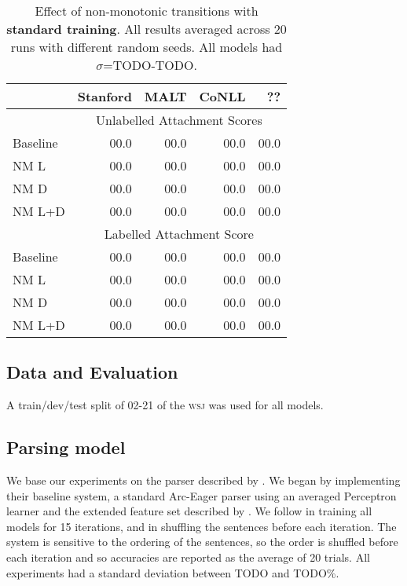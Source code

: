 \documentclass[11pt,letterpaper]{article}
\newcommand{\wsj}{\textsc{wsj}\xspace}
\begin{document}
\begin{table}[t]
    \small
    \centering
    \begin{tabular}{l|rrrr}
        \hline
                              & Stanford & MALT & CoNLL & ?? \\
        \hline \hline
                              & \multicolumn{4}{c}{Unlabelled Attachment Scores} \\
        \hline
        Baseline              &  00.0  & 00.0 & 00.0 & 00.0   \\
        NM L                  &  00.0  & 00.0 & 00.0 & 00.0   \\
        NM D                  &  00.0  & 00.0 & 00.0 & 00.0   \\
        NM L+D                &  00.0  & 00.0 & 00.0 & 00.0    \\ 
        \hline
                              & \multicolumn{4}{c}{Labelled Attachment Score} \\
        \hline
        Baseline              &  00.0  & 00.0 & 00.0  & 00.0   \\
        NM L                  &  00.0  & 00.0 & 00.0  & 00.0   \\
        NM D                  &  00.0  & 00.0 & 00.0  & 00.0   \\
        NM L+D                &  00.0  & 00.0 & 00.0  & 00.0   \\ 
        \hline
    \end{tabular}
    \caption{\small Effect of non-monotonic transitions with \textbf{standard training}.
             All results averaged across 20 runs with different random seeds. All models
             had $\sigma$=TODO-TODO.\label{tab:standard}}
\end{table}


\subsection{Data and Evaluation}



A train/dev/test split of 02-21 of the \wsj was used for all models.


\subsection{Parsing model}

We base our experiments on the parser described by \citet{goldberg:12}. We
began by implementing their baseline system, a standard Arc-Eager parser using
an averaged Perceptron learner and the extended feature set described by \citet{zhang:11}.
We follow \citeauthor{goldberg:12} in training all models for 15 iterations,
and in shuffling the sentences before each iteration.
The system is sensitive to the ordering of the sentences, so
the order is shuffled before each iteration and
so accuracies are reported as the average of 20 trials. All experiments had a
standard deviation between TODO and TODO\%.
\end{document}
